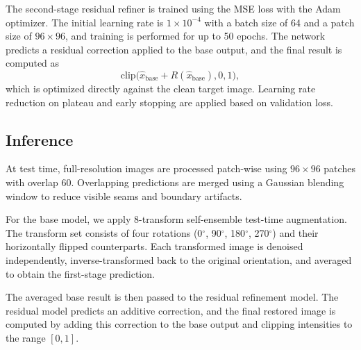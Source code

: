 \documentclass[10pt,twocolumn,letterpaper]{article}
\begin{document}
The second-stage residual refiner is trained using the MSE loss with the Adam optimizer. The initial learning rate is $1\times10^{-4}$ with a batch size of 64 and a patch size of $96\times96$, and training is performed for up to 50 epochs. The network predicts a residual correction applied to the base output, and the final result is computed as
\[
\mathrm{clip}\big(\hat{x}_{\text{base}} + R(\hat{x}_{\text{base}}), 0, 1\big),
\]
which is optimized directly against the clean target image. Learning rate reduction on plateau and early stopping are applied based on validation loss.

\subsection{Inference}

At test time, full-resolution images are processed patch-wise using $96\times96$ patches with overlap 60. Overlapping predictions are merged using a Gaussian blending window to reduce visible seams and boundary artifacts.

For the base model, we apply 8-transform self-ensemble test-time augmentation. The transform set consists of four rotations (0$^\circ$, 90$^\circ$, 180$^\circ$, 270$^\circ$) and their horizontally flipped counterparts. Each transformed image is denoised independently, inverse-transformed back to the original orientation, and averaged to obtain the first-stage prediction.

The averaged base result is then passed to the residual refinement model. The residual model predicts an additive correction, and the final restored image is computed by adding this correction to the base output and clipping intensities to the range $[0,1]$.

{\small


}
\end{document}
